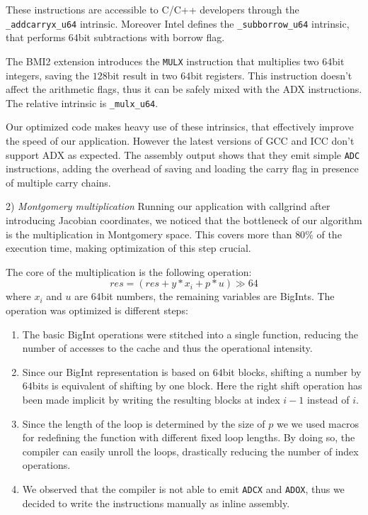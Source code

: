 These instructions are accessible to C/C++ developers through the \texttt{\_addcarryx\_u64} intrinsic. Moreover Intel defines the \texttt{\_subborrow\_u64} intrinsic, that performs $64$bit subtractions with borrow flag.

The BMI2 extension introduces the \texttt{MULX} instruction that multiplies two $64$bit integers, saving the $128$bit result in two $64$bit registers. This instruction doesn't affect the arithmetic flags, thus it can be safely mixed with the ADX instructions. The relative intrinsic is \texttt{\_mulx\_u64}. 

Our optimized code makes heavy use of these intrinsics, that effectively improve the speed of our application. However the latest versions of GCC and ICC don't support ADX as expected. The assembly output shows that they emit simple \texttt{ADC} instructions, adding the overhead of saving and loading the carry flag in presence of multiple carry chains.

2) \emph{Montgomery multiplication}
Running our application with callgrind after introducing Jacobian coordinates, we noticed that the bottleneck of our algorithm is the multiplication in Montgomery space. This covers more than $80\%$ of the execution time, making optimization of this step crucial.
 
The core of the multiplication is the following operation:
$$res = \left(res + y * x_i + p * u\right) \gg 64$$
where $x_i$ and $u$ are $64$bit numbers, the remaining variables are BigInts. The operation was optimized is different steps:
\begin{enumerate}
\item The basic BigInt operations were stitched into a single function, reducing the number of accesses to the cache and thus the operational intensity.
\item Since our BigInt representation is based on $64$bit blocks, shifting a number by $64$bits is equivalent of shifting by one block. Here the right shift operation has been made implicit by writing the resulting blocks at index $i-1$ instead of $i$.
\item Since the length of the loop is determined by the size of $p$ we we used macros for redefining the function with different fixed loop lengths. By doing so, the compiler can easily unroll the loops, drastically reducing the number of index operations. 
\item We observed that the compiler is not able to emit \texttt{ADCX} and \texttt{ADOX}, thus we decided to write the instructions manually as inline assembly. 
\end{enumerate}

